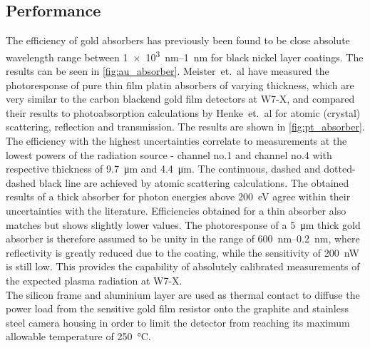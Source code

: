         \subsection{Performance}\label{subsec:performance}%
%
            The efficiency of gold absorbers has previously been found to be close absolute wavelength range between \SIrange{1e3}{1}{\nano\meter} for black nickel layer coatings\cite{Lang1996}. The results can be seen in \cref{fig:au_absorber}. Meister~et.~al\cite{Meister2013} have measured the photoresponse of pure thin film platin absorbers of varying thickness, which are very similar to the carbon blackend gold film detectors at W7-X, and compared their results to photoabsorption calculations by Henke~et.~al\cite{Henke1993} for atomic (crystal) scattering, reflection and transmission. The results are shown in \cref{fig:pt_absorber}. The efficiency with the highest uncertainties correlate to measurements at the lowest powers of the radiation source - channel no.1 and channel no.4 with respective thickness of \SI{9.7}{\micro\meter} and \SI{4.4}{\micro\meter}. The continuous, dashed and dotted-dashed black line are achieved by atomic scattering calculations\cite{Henke1993,Palik1997}. The obtained results of a thick absorber for photon energies above \SI{200}{\electronvolt} agree within their uncertainties with the literature. Efficiencies obtained for a thin absorber also matches but shows slightly lower values. The photoresponse of a \SI{5}{\micro\meter} thick gold absorber is therefore assumed to be unity in the range of \SIrange{600}{0.2}{\nano\meter}, where reflectivity is greatly reduced due to the coating, while the sensitivity of \SI{200}{\nano\watt} is still low. This provides the capability of absolutely calibrated measurements of the expected plasma radiation at W7-X.\\%
            The silicon frame and aluminium layer are used as thermal contact to diffuse the power load from the sensitive gold film resistor onto the graphite and stainless steel camera housing in order to limit the detector from reaching its maximum allowable temperature of \SI{250}{\celsius}.\\%
%
